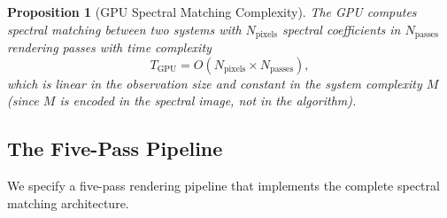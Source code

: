 \documentclass[11pt,twocolumn,a4paper]{article}
\newtheorem{proposition}[theorem]{Proposition}
\theoremstyle{definition}
\theoremstyle{remark}
\begin{document}
\begin{proposition}[GPU Spectral Matching Complexity]\label{prop:gpu-complexity}
The GPU computes spectral matching between two systems with $N_{\mathrm{pixels}}$ spectral coefficients in $N_{\mathrm{passes}}$ rendering passes with time complexity
\begin{equation}\label{eq:gpu-complexity}
    T_{\mathrm{GPU}} = O(N_{\mathrm{pixels}} \times N_{\mathrm{passes}}),
\end{equation}
which is linear in the observation size and constant in the system complexity $M$ (since $M$ is encoded in the spectral image, not in the algorithm).
\end{proposition}

\subsection{The Five-Pass Pipeline}

We specify a five-pass rendering pipeline that implements the complete spectral matching architecture.
\end{document}
